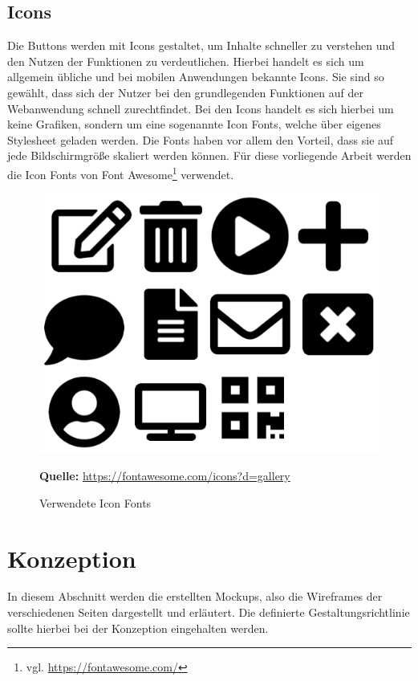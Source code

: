 \subsection{Icons}
\label{subsec:icons}
Die Buttons werden mit Icons gestaltet, um Inhalte schneller zu verstehen und den Nutzen der Funktionen zu verdeutlichen. Hierbei handelt es sich um allgemein übliche und bei mobilen Anwendungen bekannte Icons. Sie sind so gewählt, dass sich der Nutzer bei den grundlegenden Funktionen auf der Webanwendung schnell zurechtfindet. Bei den Icons handelt es sich hierbei um keine Grafiken, sondern um eine sogenannte Icon Fonts, welche über eigenes Stylesheet geladen werden. Die Fonts haben vor allem den Vorteil, dass sie auf jede Bildschirmgröße skaliert werden können. Für diese vorliegende Arbeit werden die Icon Fonts von Font Awesome\footnote{vgl. \url{https://fontawesome.com/}} verwendet.\bigskip

\begin{figure}[H]
  \begin{center}
    \includegraphics[scale=0.5]{img/icons}
	\caption{Verwendete Icon Fonts} 
	\footnotesize\sffamily\textbf{Quelle:} \url{https://fontawesome.com/icons?d=gallery}  
	\label{fig:icons}
  \end{center}   
\end{figure}

\newpage
\section{Konzeption}
\label{sec:konzeption}
In diesem Abschnitt werden die erstellten Mockups, also die Wireframes der verschiedenen Seiten dargestellt und erläutert. Die definierte Gestaltungsrichtlinie sollte hierbei bei der Konzeption eingehalten werden.\bigskip

